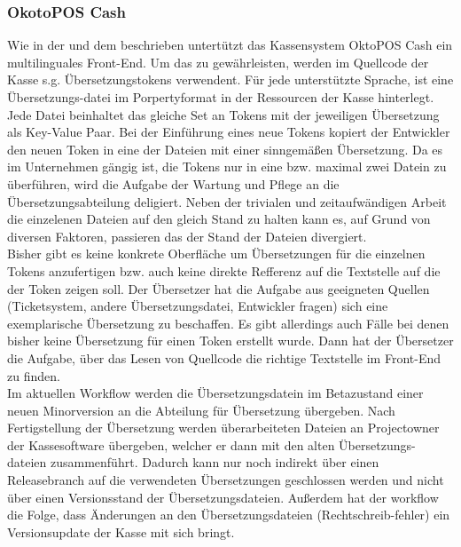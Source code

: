 \documentclass[10pt, oneside]{article}
\newcommand{\secref}[1]{\hyperref[{#1}]{\nameref{#1}}}
\begin{document}
  \subsubsection{OkotoPOS Cash}\label{sec:analyse:current:cash}%
    Wie in der \secref{sec:projectdesc} und dem \secref{sec:projectEnv} beschrieben untertützt das Kassensystem OktoPOS Cash ein multilinguales Front-End.
    Um das zu gewährleisten, werden im Quellcode der Kasse s.g. Übersetzungstokens verwendent. Für jede unterstützte Sprache, ist eine Übersetzungs-datei im Porpertyformat
    in der Ressourcen der Kasse hinterlegt. Jede Datei beinhaltet das gleiche Set an Tokens mit der jeweiligen Übersetzung als Key-Value Paar. 
    Bei der Einführung eines neue Tokens kopiert der  Entwickler den neuen Token in eine der Dateien mit einer sinngemäßen Übersetzung.
    Da es im Unternehmen gängig ist, die Tokens nur in eine bzw. maximal zwei Datein zu überführen, wird die Aufgabe der Wartung und Pflege an 
    die Übersetzungsabteilung deligiert. Neben der trivialen und zeitaufwändigen Arbeit die einzelenen Dateien auf den gleich Stand zu halten
    kann es, auf Grund von diversen Faktoren, passieren das der Stand der Dateien divergiert.\\
    Bisher gibt es keine konkrete Oberfläche um Übersetzungen für die einzelnen Tokens anzufertigen bzw. auch keine direkte Refferenz auf die Textstelle 
    auf die der Token zeigen soll. Der Übersetzer hat die Aufgabe aus geeigneten Quellen (Ticketsystem, andere Übersetzungsdatei, Entwickler fragen) sich eine exemplarische Übersetzung
    zu beschaffen. Es gibt allerdings auch Fälle bei denen bisher keine Übersetzung für einen Token erstellt wurde. Dann hat der Übersetzer die Aufgabe, 
    über das Lesen von Quellcode die richtige Textstelle im Front-End zu finden.\\
    Im aktuellen Workflow werden die Übersetzungsdatein im Betazustand einer neuen Minorversion an die Abteilung für Übersetzung übergeben. Nach Fertigstellung
    der Übersetzung werden überarbeiteten Dateien an Projectowner der Kassesoftware übergeben, welcher er dann mit den alten Übersetzungs-dateien zusammenführt.
    Dadurch kann nur noch indirekt über einen Releasebranch auf die verwendeten Übersetzungen geschlossen werden und nicht über einen Versionsstand der Übersetzungsdateien. 
    Außerdem hat der workflow die Folge, dass Änderungen an den Übersetzungsdateien (Rechtschreib-fehler) ein Versionsupdate der Kasse mit sich bringt.\\
\end{document}
